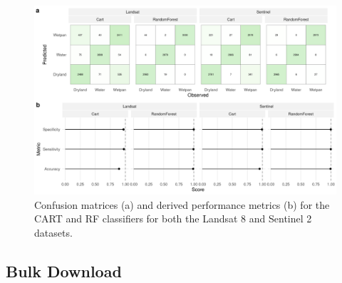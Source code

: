 \documentclass[../FinalThesis.tex]{subfiles}
\begin{document}
\begin{figure}[htpb]
 \begin{center}
  \includegraphics[width = \textwidth]{Figures/ClassificationValidation.png}
  \caption{Confusion matrices (a) and derived performance metrics (b) for the
  CART and RF classifiers for both the Landsat 8 and Sentinel 2 datasets.}
  \label{ClassificationValidation}
 \end{center}
\end{figure}

\subsection{Bulk Download}
\end{document}
